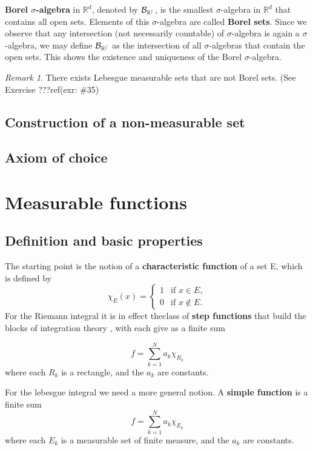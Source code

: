\documentclass[
]{book}
\theoremstyle{definition}
\theoremstyle{definition}
\theoremstyle{definition}
\theoremstyle{definition}
\theoremstyle{remark}
\newtheorem*{remark}{Remark}
\begin{document}
\textbf{Borel \(\sigma\)-algebra} in \(\mathbb{R}^d\), denoted by \(\cal B_{\mathbb{R}^d}\), is the smallest \(\sigma\)-algebra in \(\mathbb{R}^d\) that contains all open sets. Elements of this \(\sigma\)-algebra are called \textbf{Borel sets}. Since we observe that any intersection (not necessarily countable) of \(\sigma\)-algebra is again a \(\sigma\)-algebra, we may define \(\cal B_{\mathbb{R}^d}\) as the intersection of all \(\sigma\)-algebras that contain the open sets. This shows the existence and uniqueness of the Borel \(\sigma\)-algebra.

\begin{remark}
There exists Lebesgue measurable sets that are not Borel sets. (See Exercise ???ref(exr: \#35)
\end{remark}

\subsection{Construction of a non-measurable set}\label{construction-of-a-non-measurable-set}

\subsection{Axiom of choice}\label{axiom-of-choice}

\section{Measurable functions}\label{measurable-functions}

\subsection{Definition and basic properties}\label{definition-and-basic-properties}

The starting point is the notion of a \textbf{characteristic function} of a set E, which is defined by
\[
\chi_E(x)=
\begin{cases}
1& \text{if }x\in E,\\
0& \text{if }x\not\in E.
\end{cases}
\]
For the Riemann integral it is in effect theclass of \textbf{step functions} that build the blocks of integration theory , with each give as a finite sum

\[
f = \sum_{k=1}^Na_k\chi_{R_k}
\]
where each \(R_k\) is a rectangle, and the \(a_k\) are constants.

For the lebesgue integral we need a more general notion. A \textbf{simple function} is a finite sum
\[
f = \sum_{k=1}^Na_k\chi_{E_k}
\]
where each \(E_k\) is a measurable set of finite measure, and the \(a_k\) are constants.
\end{document}
